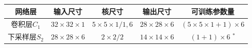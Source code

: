 \documentclass[12pt,a4paper,UTF8,twoside]{book}
\begin{document}
\begin{longtable}[]{@{}ccccc@{}}
\toprule
\begin{minipage}[b]{0.12\columnwidth}\centering
网络层\strut
\end{minipage} & \begin{minipage}[b]{0.16\columnwidth}\centering
输入尺寸\strut
\end{minipage} & \begin{minipage}[b]{0.19\columnwidth}\centering
核尺寸\strut
\end{minipage} & \begin{minipage}[b]{0.16\columnwidth}\centering
输出尺寸\strut
\end{minipage} & \begin{minipage}[b]{0.24\columnwidth}\centering
可训练参数量\strut
\end{minipage}\tabularnewline
\midrule
\endhead
\begin{minipage}[t]{0.12\columnwidth}\centering
卷积层\(C_1\)\strut
\end{minipage} & \begin{minipage}[t]{0.16\columnwidth}\centering
\(32\times32\times1\)\strut
\end{minipage} & \begin{minipage}[t]{0.19\columnwidth}\centering
\(5\times5\times1/1,6\)\strut
\end{minipage} & \begin{minipage}[t]{0.16\columnwidth}\centering
\(28\times28\times6\)\strut
\end{minipage} & \begin{minipage}[t]{0.24\columnwidth}\centering
\((5\times5\times1+1)\times6\)\strut
\end{minipage}\tabularnewline
\begin{minipage}[t]{0.12\columnwidth}\centering
下采样层\(S_2\)\strut
\end{minipage} & \begin{minipage}[t]{0.16\columnwidth}\centering
\(28\times28\times6\)\strut
\end{minipage} & \begin{minipage}[t]{0.19\columnwidth}\centering
\(2\times2/2\)\strut
\end{minipage} & \begin{minipage}[t]{0.16\columnwidth}\centering
\(14\times14\times6\)\strut
\end{minipage} & \begin{minipage}[t]{0.24\columnwidth}\centering
\((1+1)\times6\) \(^*\)\strut
\end{minipage}\tabularnewline

\end{longtable}
\end{document}
